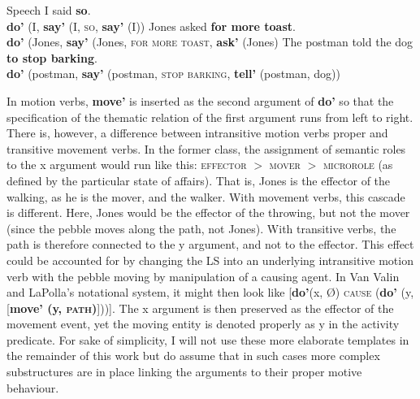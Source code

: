 \ea Speech \label{ex_english2}
\ea I said \textbf{so}. \\
\textbf{do'} (I, \textbf{say'} (I, \textsc{so}, \textbf{say'} (I))
\ex Jones asked \textbf{for more toast}. \\
\textbf{do'} (Jones, \textbf{say'} (Jones, \textsc{for more toast},  \textbf{ask'} (Jones)
\ex The postman told the dog \textbf{to stop barking}. \\
\textbf{do'} (postman, \textbf{say'} (postman, \textsc{stop barking}, \textbf{tell'} (postman, dog))
\z
\z


In motion verbs, \textbf{move'} is inserted as the second argument of \textbf{do'} so that the specification of the thematic relation of the first argument runs from left to right. There is, however, a difference between intransitive motion verbs proper and transitive movement verbs. In the former class, the assignment of semantic roles to the x argument would run like this: \textsc{effector} $>$ \textsc{mover} $>$ \textsc{microrole} (as defined by the particular state of affairs). That is, Jones is the effector of the walking, as he is the mover, and the walker. With movement verbs, this cascade is different. Here, Jones would be the effector of the throwing, but not the mover (since the pebble moves along the path, not Jones). With transitive verbs, the path is therefore connected to the y argument, and not to the effector. This effect could be accounted for by changing the LS into an underlying intransitive motion verb with the pebble moving by manipulation of a causing agent. In Van Valin and LaPolla's notational system, it might then look like [\textbf{do'}(x, Ø) \textsc{cause} (\textbf{do'} (y, [\textbf{move' (y, \textsc{path})}]))]. The x argument is then preserved as the effector of the movement event, yet the moving entity is denoted properly as y in the activity predicate. For sake of simplicity, I will not use these more elaborate templates in the remainder of this work but do assume that in such cases more complex substructures are in place linking the arguments to their proper motive behaviour.

